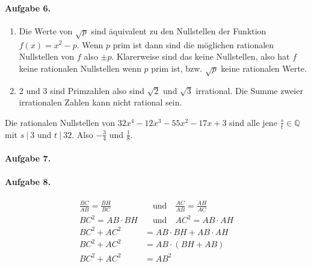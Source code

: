 \documentclass{article}
\begin{document}
\paragraph{Aufgabe 6.}
\begin{enumerate}
    \item Die Werte von $\sqrt{p}$ sind äquivalent zu den Nullstellen der Funktion $f(x) = x^2 - p$. Wenn $p$ prim ist dann sind die möglichen rationalen Nullstellen von $f$ also $\pm p$. Klarerweise sind das keine Nullstellen, also hat $f$ keine rationalen Nullstellen wenn $p$ prim ist, bzw. $\sqrt{p}$ keine rationalen Werte.
    
    \item 2 und 3 sind Primzahlen also sind $\sqrt{2}$ und $\sqrt{3}$ irrational. Die Summe zweier irrationalen Zahlen kann nicht rational sein.
\end{enumerate}

Die rationalen Nullstellen von $32x^4 - 12x^3 - 55x^2 - 17x + 3$ sind alle jene $\frac{s}{t} \in \mathbb{Q}$ mit $s\ |\ 3$ und $t\ |\ 32$. Also $-\frac{3}{4}$ und $\frac{1}{8}$.

\paragraph{Aufgabe 7.} 

\paragraph{Aufgabe 8.}
\begin{align*}
    \frac{BC}{AB} = \frac{BH}{BC} &\quad\text{und}\quad \frac{AC}{AB} = \frac{AH}{AC} \\
    BC^2 = AB \cdot BH &\quad\text{und}\quad AC^2 = AB \cdot AH \\
    BC^2 + AC^2 &= AB \cdot BH + AB \cdot AH \\
    BC^2 + AC^2 &= AB \cdot (BH + AB) \\
    BC^2 + AC^2 &= AB^2
\end{align*}
\end{document}
